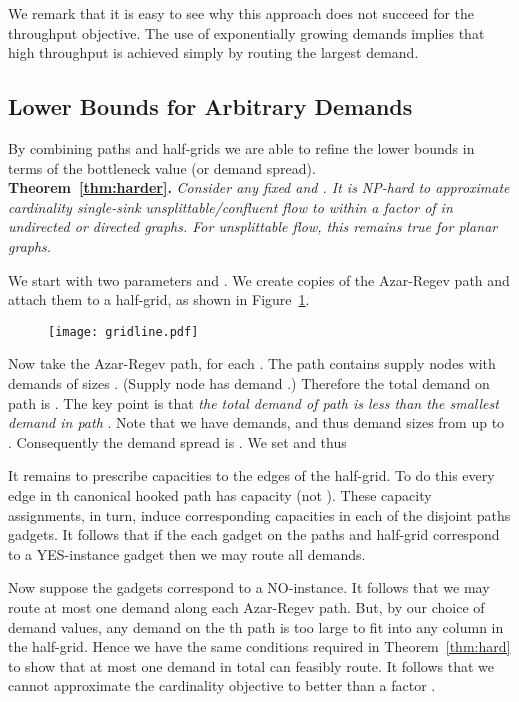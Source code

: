 \documentclass[12pt]{article}
\begin{document}
We remark that it is easy to see why this approach does not succeed for the throughput objective.
The use of exponentially growing demands implies that high throughput is achieved simply
by routing the largest demand.


\subsection{Lower Bounds for Arbitrary Demands}\label{sec:refine}

By combining paths and half-grids we are able to refine the lower
bounds in terms of the bottleneck value (or demand spread).\\

{{\noindent\bf Theorem~\ref{thm:harder}.} \itshape
Consider any fixed  and  .
It is NP-hard to approximate cardinality single-sink unsplittable/confluent flow
to within a factor of 
in undirected or directed graphs. For unsplittable flow, this remains true for planar graphs.\\
}

We start with two parameters  and . We create  copies of
the Azar-Regev path
 and attach them to a  half-grid, as shown in Figure~\ref{fig:gridline}.

\begin{figure}[h]
\begin{center}
\texttt{[image: gridline.pdf]}\\
\vspace{-2.5cm}
\caption{\label{fig:gridline}}
\end{center}
\end{figure}

 Now take the  Azar-Regev path, for each . The path
 contains  supply nodes with demands of sizes . (Supply node  has
 demand .) Therefore the total demand on path  is . The key point is that
{\em the total demand of path  is less than the smallest demand in path }.
Note that we have  demands, and thus demand sizes from  up to .
Consequently the demand spread is . We set  and thus


 It remains to prescribe capacities to the edges of the half-grid.
To do this every edge in th canonical hooked path has capacity  (not ). These capacity assignments,
in turn, induce corresponding capacities in each of the disjoint paths gadgets.
It follows that if the each gadget on the paths and half-grid correspond to a YES-instance gadget then we may
route all  demands.

Now suppose the gadgets correspond to a NO-instance. It follows that we may route at most one demand along each Azar-Regev path.
But, by our choice of demand values, any demand on the th path is too large to fit into any column  in the half-grid.
Hence we have the same conditions required in Theorem~\ref{thm:hard} to show that at most one demand in total can feasibly route.
It follows that we cannot approximate the cardinality objective to better than a factor .
\end{document}
